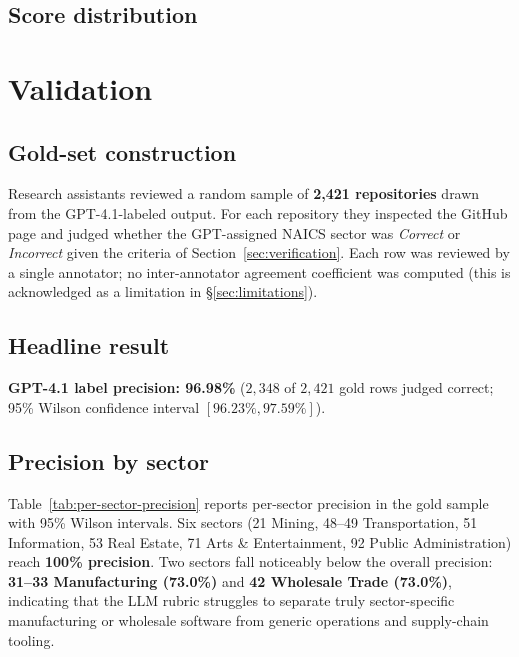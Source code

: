 \documentclass{article}
\begin{document}
\subsection{Score distribution}
\label{sec:desc:score}


\section{Validation}
\label{sec:validation}

\subsection{Gold-set construction}
Research assistants reviewed a random sample of \textbf{2{,}421
repositories} drawn from the GPT-4.1-labeled output. For each
repository they inspected the GitHub page and judged whether the
GPT-assigned NAICS sector was \emph{Correct} or \emph{Incorrect}
given the criteria of Section~\ref{sec:verification}. Each row was
reviewed by a single annotator; no inter-annotator agreement
coefficient was computed (this is acknowledged as a limitation in
\S\ref{sec:limitations}).

\subsection{Headline result}
\textbf{GPT-4.1 label precision: 96.98\%} ($2{,}348$ of $2{,}421$
gold rows judged correct; 95\% Wilson confidence interval
$[96.23\%, 97.59\%]$).

\subsection{Precision by sector}
Table~\ref{tab:per-sector-precision} reports per-sector precision
in the gold sample with 95\% Wilson intervals. Six sectors
(21 Mining, 48--49 Transportation, 51 Information, 53 Real Estate,
71 Arts \& Entertainment, 92 Public Administration) reach
\textbf{100\% precision}. Two sectors fall noticeably below the
overall precision: \textbf{31--33 Manufacturing (73.0\%)} and
\textbf{42 Wholesale Trade (73.0\%)}, indicating that the LLM rubric
struggles to separate truly sector-specific manufacturing or
wholesale software from generic operations and supply-chain tooling.
\end{document}
